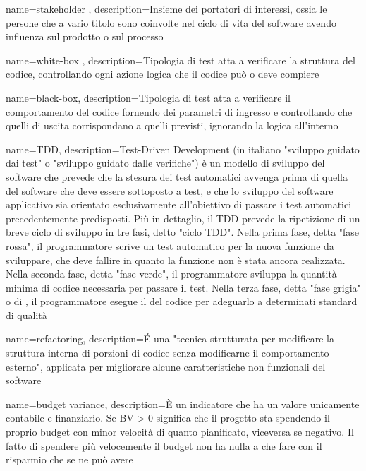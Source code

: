 {
	name=stakeholder ,
	description={Insieme dei portatori di interessi, ossia le persone che a vario titolo sono coinvolte nel ciclo di vita del software avendo influenza sul prodotto o sul processo}
}

{
	name=white-box ,
	description={Tipologia di test atta a verificare la struttura del codice, controllando ogni azione logica che il codice può o deve compiere}
}

{
	name=black-box,
	description={Tipologia di test atta a verificare il comportamento del codice fornendo dei parametri di ingresso e controllando che quelli di uscita corrispondano a quelli previsti, ignorando la logica all’interno}
}

{
	name=TDD,
	description={Test-Driven Development (in italiano "sviluppo guidato dai test" o "sviluppo guidato dalle verifiche") è un modello di sviluppo del software che prevede che la stesura dei test automatici avvenga prima di quella del software che deve essere sottoposto a test, e che lo sviluppo del software applicativo sia orientato esclusivamente all'obiettivo di passare i test automatici precedentemente predisposti.
Più in dettaglio, il TDD prevede la ripetizione di un breve ciclo di sviluppo in tre fasi, detto "ciclo TDD". Nella prima fase, detta "fase rossa", il programmatore scrive un test automatico per la nuova funzione da sviluppare, che deve fallire in quanto la funzione non è stata ancora realizzata. Nella seconda fase, detta "fase verde", il programmatore sviluppa la quantità minima di codice necessaria per passare il test. Nella terza fase, detta "fase grigia" o di , il programmatore esegue il  del codice per adeguarlo a determinati standard di qualità}
}

{
	name=refactoring,
	description={\'E una "tecnica strutturata per modificare la struttura interna di porzioni di codice senza modificarne il comportamento esterno", applicata per migliorare alcune caratteristiche non funzionali del software}
}

{
	name=budget variance,
	description={È un indicatore che ha un valore unicamente contabile e finanziario. Se BV > 0 significa che il progetto sta spendendo il proprio budget con minor velocità di quanto pianificato, viceversa se negativo. Il fatto di spendere più velocemente il budget non ha nulla a che fare con il risparmio che se ne può avere}
}

